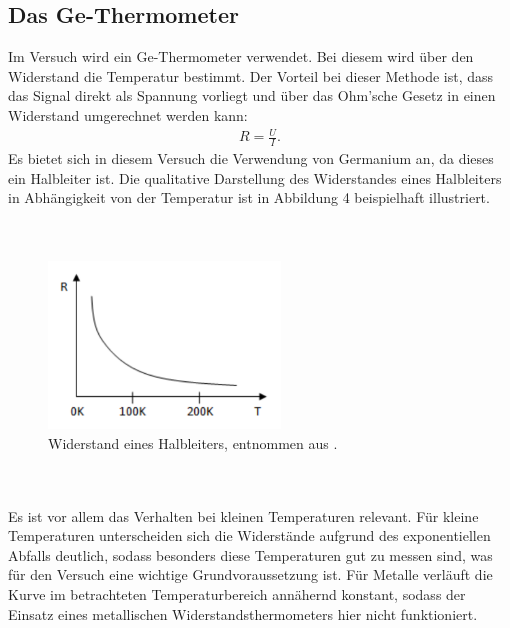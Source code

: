 \documentclass[german,  %
parskip=full,  %
]{scrartcl}
\begin{document}
\subsection{Das Ge-Thermometer}
Im Versuch wird ein Ge-Thermometer verwendet. Bei diesem wird über den Widerstand die Temperatur bestimmt. Der Vorteil bei dieser Methode ist, dass das Signal direkt als Spannung vorliegt und über das Ohm'sche Gesetz in einen Widerstand umgerechnet werden kann:
\begin{align}
R = \frac{U}{I}.
\end{align} 
Es bietet sich in diesem Versuch die Verwendung von Germanium an, da dieses ein Halbleiter ist. Die qualitative Darstellung des Widerstandes eines Halbleiters in Abhängigkeit von der Temperatur ist in Abbildung 4 beispielhaft illustriert.
\\\\\\
\begin{figure}[h!]
\centering
\includegraphics[width=0.55\textwidth]{res_sc}
\caption{Widerstand eines Halbleiters, entnommen aus \cite{4}.}
\end{figure}
\\\\
Es ist vor allem das Verhalten bei kleinen Temperaturen relevant. Für kleine Temperaturen unterscheiden sich die Widerstände aufgrund des exponentiellen Abfalls deutlich, sodass besonders diese Temperaturen gut zu messen sind, was für den Versuch eine wichtige Grundvoraussetzung ist. Für Metalle verläuft die Kurve im betrachteten Temperaturbereich annähernd konstant, sodass der Einsatz eines metallischen Widerstandsthermometers hier nicht funktioniert.

\newpage
\end{document}
